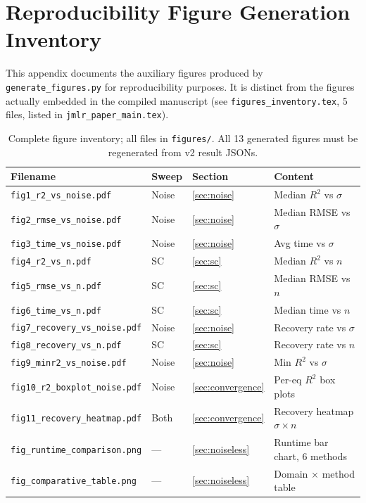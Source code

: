 \documentclass[twoside,11pt]{article}
\newcommand{\Rsq}{R^{2}}
\begin{document}
\section{Reproducibility Figure Generation Inventory}
\label{app:figures}

\noindent This appendix documents the auxiliary figures produced by
\texttt{generate\_figures.py} for reproducibility purposes. It is
distinct from the figures actually embedded in the compiled
manuscript (see \texttt{figures\_inventory.tex}, 5 files, listed in
\texttt{jmlr\_paper\_main.tex}).

\begin{table}[H]
\centering
\caption{Complete figure inventory; all files in \texttt{figures/}.
  All 13 generated figures must be regenerated from v2 result JSONs.}
\label{tab:figlist}
\small
\renewcommand{\arraystretch}{1.25}
\begin{tabular}{L{4.8cm} L{1.5cm} L{1.8cm} L{3.2cm}}
\toprule
\textbf{Filename} & \textbf{Sweep} & \textbf{Section} & \textbf{Content}\\
\midrule
\texttt{fig1\_r2\_vs\_noise.pdf}       & Noise & \ref{sec:noise}        & Median $\Rsq$ vs $\sigma$\\
\texttt{fig2\_rmse\_vs\_noise.pdf}     & Noise & \ref{sec:noise}        & Median RMSE vs $\sigma$\\
\texttt{fig3\_time\_vs\_noise.pdf}     & Noise & \ref{sec:noise}        & Avg time vs $\sigma$\\
\texttt{fig4\_r2\_vs\_n.pdf}           & SC    & \ref{sec:sc}           & Median $\Rsq$ vs $n$\\
\texttt{fig5\_rmse\_vs\_n.pdf}         & SC    & \ref{sec:sc}           & Median RMSE vs $n$\\
\texttt{fig6\_time\_vs\_n.pdf}         & SC    & \ref{sec:sc}           & Median time vs $n$\\
\texttt{fig7\_recovery\_vs\_noise.pdf} & Noise & \ref{sec:noise}        & Recovery rate vs $\sigma$\\
\texttt{fig8\_recovery\_vs\_n.pdf}     & SC    & \ref{sec:sc}           & Recovery rate vs $n$\\
\texttt{fig9\_minr2\_vs\_noise.pdf}    & Noise & \ref{sec:noise}        & Min $\Rsq$ vs $\sigma$\\
\texttt{fig10\_r2\_boxplot\_noise.pdf} & Noise & \ref{sec:convergence}  & Per-eq $\Rsq$ box plots\\
\texttt{fig11\_recovery\_heatmap.pdf}  & Both  & \ref{sec:convergence}  & Recovery heatmap $\sigma \times n$\\
\midrule
\texttt{fig\_runtime\_comparison.png}  & ---   & \ref{sec:noiseless}    & Runtime bar chart, 6 methods\\
\texttt{fig\_comparative\_table.png}   & ---   & \ref{sec:noiseless}    & Domain $\times$ method table\\
\bottomrule
\end{tabular}
\end{table}
\end{document}
